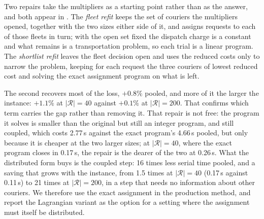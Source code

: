 Two repairs take the multipliers as a starting point rather than as the answer,
and both appear in . The \emph{fleet refit} keeps the
set of couriers the multipliers opened, together with the two sizes either side
of it, and assigns requests to each of those fleets in turn; with the open set
fixed the dispatch charge is a constant and what remains is a transportation
problem, so each trial is a linear program. The \emph{shortlist refit} leaves
the fleet decision open and uses the reduced costs only to narrow the problem,
keeping for each request the three couriers of lowest reduced cost and solving
the exact assignment program on what is left.

The second recovers most of the loss, $+0.8\%$ pooled, and more of
it the larger the instance:
$+1.1\%$ at $|\mathcal{R}|=40$ against
$+0.1\%$ at $|\mathcal{R}|=200$. That confirms which
term carries the gap rather than removing it. That repair is not free: the
program it solves is smaller than the original but still an integer program, and
still coupled, which costs
2.77\,s against the exact program's
4.66\,s pooled, but only because it is cheaper at the two
larger sizes; at $|\mathcal{R}|=40$, where the exact program
closes in 0.17\,s, the repair is the dearer of the two at
0.26\,s. What the distributed form buys is the coupled step:
16 times less serial time
pooled, and a saving that grows with the instance, from
1.5 times at $|\mathcal{R}|=40$ (0.17\,s against 0.11\,s) to
21 times at $|\mathcal{R}|=200$, in a step that
needs no information about other couriers. We therefore use the
exact assignment in the production method, and report the Lagrangian variant as
the option for a setting where the assignment must itself be distributed.

